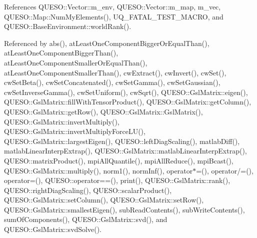 References Q\-U\-E\-S\-O\-::\-Vector\-::m\-\_\-env, Q\-U\-E\-S\-O\-::\-Vector\-::m\-\_\-map, m\-\_\-vec, Q\-U\-E\-S\-O\-::\-Map\-::\-Num\-My\-Elements(), U\-Q\-\_\-\-F\-A\-T\-A\-L\-\_\-\-T\-E\-S\-T\-\_\-\-M\-A\-C\-R\-O, and Q\-U\-E\-S\-O\-::\-Base\-Environment\-::world\-Rank().



Referenced by abs(), at\-Least\-One\-Component\-Bigger\-Or\-Equal\-Than(), at\-Least\-One\-Component\-Bigger\-Than(), at\-Least\-One\-Component\-Smaller\-Or\-Equal\-Than(), at\-Least\-One\-Component\-Smaller\-Than(), cw\-Extract(), cw\-Invert(), cw\-Set(), cw\-Set\-Beta(), cw\-Set\-Concatenated(), cw\-Set\-Gamma(), cw\-Set\-Gaussian(), cw\-Set\-Inverse\-Gamma(), cw\-Set\-Uniform(), cw\-Sqrt(), Q\-U\-E\-S\-O\-::\-Gsl\-Matrix\-::eigen(), Q\-U\-E\-S\-O\-::\-Gsl\-Matrix\-::fill\-With\-Tensor\-Product(), Q\-U\-E\-S\-O\-::\-Gsl\-Matrix\-::get\-Column(), Q\-U\-E\-S\-O\-::\-Gsl\-Matrix\-::get\-Row(), Q\-U\-E\-S\-O\-::\-Gsl\-Matrix\-::\-Gsl\-Matrix(), Q\-U\-E\-S\-O\-::\-Gsl\-Matrix\-::invert\-Multiply(), Q\-U\-E\-S\-O\-::\-Gsl\-Matrix\-::invert\-Multiply\-Force\-L\-U(), Q\-U\-E\-S\-O\-::\-Gsl\-Matrix\-::largest\-Eigen(), Q\-U\-E\-S\-O\-::left\-Diag\-Scaling(), matlab\-Diff(), matlab\-Linear\-Interp\-Extrap(), Q\-U\-E\-S\-O\-::\-Gsl\-Matrix\-::matlab\-Linear\-Interp\-Extrap(), Q\-U\-E\-S\-O\-::matrix\-Product(), mpi\-All\-Quantile(), mpi\-All\-Reduce(), mpi\-Bcast(), Q\-U\-E\-S\-O\-::\-Gsl\-Matrix\-::multiply(), norm1(), norm\-Inf(), operator$\ast$=(), operator/=(), operator=(), Q\-U\-E\-S\-O\-::operator==(), print(), Q\-U\-E\-S\-O\-::\-Gsl\-Matrix\-::rank(), Q\-U\-E\-S\-O\-::right\-Diag\-Scaling(), Q\-U\-E\-S\-O\-::scalar\-Product(), Q\-U\-E\-S\-O\-::\-Gsl\-Matrix\-::set\-Column(), Q\-U\-E\-S\-O\-::\-Gsl\-Matrix\-::set\-Row(), Q\-U\-E\-S\-O\-::\-Gsl\-Matrix\-::smallest\-Eigen(), sub\-Read\-Contents(), sub\-Write\-Contents(), sum\-Of\-Components(), Q\-U\-E\-S\-O\-::\-Gsl\-Matrix\-::svd(), and Q\-U\-E\-S\-O\-::\-Gsl\-Matrix\-::svd\-Solve().


